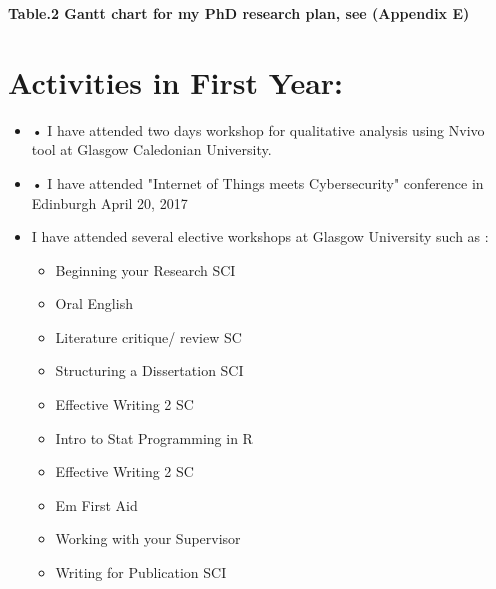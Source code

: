 	\textbf{Table.2 Gantt chart for my PhD research plan, see (Appendix E)}
\section{Activities in First Year:}

\begin{itemize}
	\item •	I have attended two days workshop for qualitative analysis using Nvivo tool at Glasgow Caledonian University.
	\item •	I have attended "Internet of Things meets Cybersecurity" conference in Edinburgh April 20, 2017
	\item I have attended several elective workshops at Glasgow University such as : \begin{itemize} 
		\item Beginning your Research SCI
		\item Oral English 
		\item Literature critique/ review SC
		\item Structuring a Dissertation SCI
		\item Effective Writing 2 SC
		\item Intro to Stat Programming in R
		\item Effective Writing 2 SC
		\item Em First Aid
		\item Working with your Supervisor
		\item Writing for Publication SCI
                \end{itemize}
\end{itemize}



